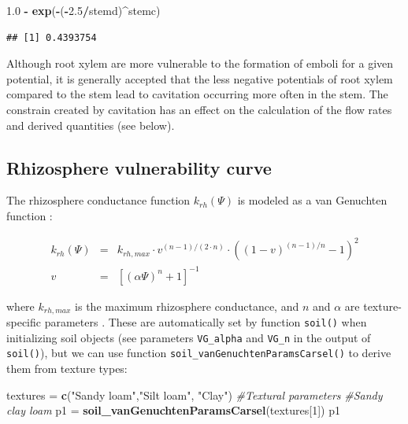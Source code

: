 \documentclass[]{book}
\newenvironment{Shaded}{\begin{snugshade}}{\end{snugshade}}
\newcommand{\KeywordTok}[1]{\textcolor[rgb]{0.13,0.29,0.53}{\textbf{#1}}}
\newcommand{\DecValTok}[1]{\textcolor[rgb]{0.00,0.00,0.81}{#1}}
\newcommand{\FloatTok}[1]{\textcolor[rgb]{0.00,0.00,0.81}{#1}}
\newcommand{\StringTok}[1]{\textcolor[rgb]{0.31,0.60,0.02}{#1}}
\newcommand{\CommentTok}[1]{\textcolor[rgb]{0.56,0.35,0.01}{\textit{#1}}}
\newcommand{\OperatorTok}[1]{\textcolor[rgb]{0.81,0.36,0.00}{\textbf{#1}}}
\newcommand{\NormalTok}[1]{#1}
\begin{document}
\begin{Shaded}
\begin{Highlighting}[]
\FloatTok{1.0} \OperatorTok{-}\StringTok{ }\KeywordTok{exp}\NormalTok{(}\OperatorTok{-}\NormalTok{(}\OperatorTok{-}\FloatTok{2.5}\OperatorTok{/}\NormalTok{stemd)}\OperatorTok{^}\NormalTok{stemc)}
\end{Highlighting}
\end{Shaded}

\begin{verbatim}
## [1] 0.4393754
\end{verbatim}

Although root xylem are more vulnerable to the formation of emboli for a
given potential, it is generally accepted that the less negative
potentials of root xylem compared to the stem lead to cavitation
occurring more often in the stem. The constrain created by cavitation
has an effect on the calculation of the flow rates and derived
quantities (see below).

\subsection{Rhizosphere vulnerability
curve}\label{rhizosphere-vulnerability-curve}

The rhizosphere conductance function \(k_{rh}(\Psi)\) is modeled as a
van Genuchten function \citep{Genuchten1980}:

\begin{eqnarray}
k_{rh}(\Psi) &=& k_{rh,max} \cdot v^{(n-1)/(2\cdot n)} \cdot ((1-v)^{(n-1)/n}-1)^2 \\
v &=& [(\alpha \Psi)^{n}+1]^{-1}
\label{eq:rhizovulnerability}
\end{eqnarray}

where \(k_{rh,max}\) is the maximum rhizosphere conductance, and \(n\)
and \(\alpha\) are texture-specific parameters
\citep{Leij1996, Carsel1988}. These are automatically set by function
\texttt{soil()} when initializing soil objects (see parameters
\texttt{VG\_alpha} and \texttt{VG\_n} in the output of \texttt{soil()}),
but we can use function \texttt{soil\_vanGenuchtenParamsCarsel()} to
derive them from texture types:

\begin{Shaded}
\begin{Highlighting}[]
\NormalTok{textures =}\StringTok{ }\KeywordTok{c}\NormalTok{(}\StringTok{"Sandy loam"}\NormalTok{,}\StringTok{"Silt loam"}\NormalTok{, }\StringTok{"Clay"}\NormalTok{)}
\CommentTok{#Textural parameters}
\CommentTok{#Sandy clay loam }
\NormalTok{p1 =}\StringTok{ }\KeywordTok{soil_vanGenuchtenParamsCarsel}\NormalTok{(textures[}\DecValTok{1}\NormalTok{])}
\NormalTok{p1}
\end{Highlighting}
\end{Shaded}
\end{document}
